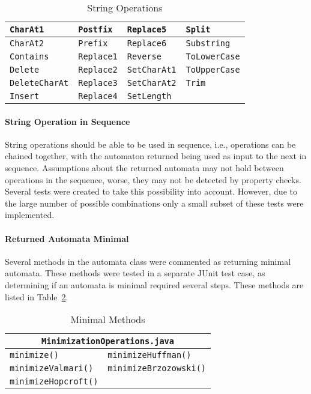 \documentclass[letterpaper,sigplan]{acmart}
\begin{document}
\begin{table}[h]
  {\footnotesize
  \begin{tabular}{l l l l}
    \toprule
    \texttt{CharAt1} & \texttt{Postfix} & \texttt{Replace5} & \texttt{Split} \\
    \midrule
    \texttt{CharAt2} & \texttt{Prefix} & \texttt{Replace6} & \texttt{Substring} \\
    \midrule
    \texttt{Contains} & \texttt{Replace1} & \texttt{Reverse} & \texttt{ToLowerCase} \\
    \midrule
    \texttt{Delete} & \texttt{Replace2} & \texttt{SetCharAt1} & \texttt{ToUpperCase} \\
    \midrule
    \texttt{DeleteCharAt} & \texttt{Replace3} & \texttt{SetCharAt2} & \texttt{Trim} \\
    \midrule
    \texttt{Insert} & \texttt{Replace4} & \texttt{SetLength} & \\
    \bottomrule
  \end{tabular}
  }
  \caption{String Operations}%
  \label{tab:string-operations}
\end{table}

\paragraph{String Operation in Sequence} String operations should be able to be
used in sequence, i.e., operations can be chained together, with the automaton
returned being used as input to the next in sequence.  Assumptions about the
returned automata may not hold between operations in the sequence, worse, they
may not be detected by property checks.  Several tests were created to take
this possibility into account.  However, due to the large number of possible
combinations only a small subset of these tests were implemented.

\paragraph{Returned Automata Minimal} Several methods in the automata class
were commented as returning minimal automata.  These methods were tested in a
separate JUnit test case, as determining if an automata is minimal required
several steps.  These methods are listed in Table~\ref{tab:minimal-methods}.

\begin{table}[h]
  {\footnotesize
    \begin{tabular}{ll}
      \toprule
      \multicolumn{2}{c}{\texttt{MinimizationOperations.java}} \\
      \midrule
      \texttt{minimize()} & \texttt{minimizeHuffman()} \\
      \midrule
      \texttt{minimizeValmari()} & \texttt{minimizeBrzozowski()} \\
      \midrule
      \texttt{minimizeHopcroft()} & \\
      \bottomrule
    \end{tabular}
  }
  \caption{Minimal Methods}%
  \label{tab:minimal-methods}
\end{table}
\end{document}
